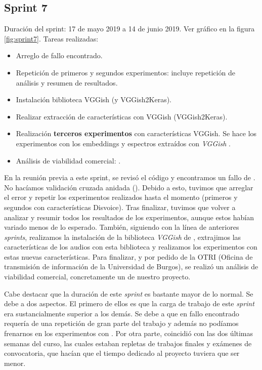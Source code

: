 \subsection{Sprint 7}
Duración del sprint: 17 de mayo 2019 a 14 de junio 2019. Ver gráfico  en la figura \ref{fig:sprint7}.
Tareas realizadas:
\begin{itemize}
\item Arreglo de fallo encontrado.
\item Repetición de primeros y segundos experimentos: incluye repetición de análisis y resumen de resultados.
\item Instalación biblioteca VGGish (y VGGish2Keras).
\item Realizar extracción de características con VGGish (VGGish2Keras).
\item Realización \textbf{terceros experimentos} con características VGGish. Se hace los experimentos con los embeddings y espectros extraídos con \textit{VGGish} \cite{vggish} .
\item Análisis de viabilidad comercial: .
\end{itemize}
En la reunión previa a este sprint, se revisó el código y encontramos un fallo de . No hacíamos validación cruzada anidada (). Debido a esto, tuvimos que arreglar el error y repetir los experimentos realizados hasta el momento (primeros y segundos con características Disvoice). Tras finalizar, tuvimos que volver a analizar y resumir todos los resultados de los experimentos, aunque estos habían variado menos de lo esperado. También, siguiendo con la línea de anteriores \textit{sprints}, realizamos la instalación de la biblioteca \textit{VGGish} de , extrajimos las características de los audios con esta biblioteca y realizamos los experimentos con estas nuevas características. Para finalizar, y por pedido de la OTRI (Oficina de transmisión de información de la Universidad de Burgos), se realizó un análisis de viabilidad comercial, concretamente un  de nuestro proyecto.

Cabe destacar que la duración de este \textit{sprint} es bastante mayor de lo normal. Se debe a dos aspectos. El primero de ellos es que la carga de trabajo de este \textit{sprint} era sustancialmente superior a los demás. Se debe a que en fallo encontrado requería de una repetición de gran parte del trabajo y además no podíamos frenarnos en los experimentos con . Por otra parte, coincidió con las dos últimas semanas del curso, las cuales estaban repletas de trabajos finales y exámenes de convocatoria, que hacían que el tiempo dedicado al proyecto tuviera que ser menor.


